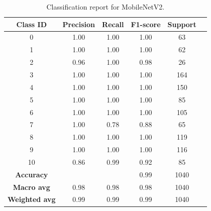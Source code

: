 \begin{table}[h]
    \centering
    \begin{tabular}{cccccc}
        \toprule
        \textbf{Class ID} & \textbf{Precision} & \textbf{Recall} & \textbf{F1-score} & \textbf{Support} \\
        \midrule
        0 & 1.00 & 1.00 & 1.00 & 63 \\
        1 & 1.00 & 1.00 & 1.00 & 62 \\
        2 & 0.96 & 1.00 & 0.98 & 26 \\
        3 & 1.00 & 1.00 & 1.00 & 164 \\
        4 & 1.00 & 1.00 & 1.00 & 150 \\
        5 & 1.00 & 1.00 & 1.00 & 85 \\
        6 & 1.00 & 1.00 & 1.00 & 105 \\
        7 & 1.00 & 0.78 & 0.88 & 65 \\
        8 & 1.00 & 1.00 & 1.00 & 119 \\
        9 & 1.00 & 1.00 & 1.00 & 116 \\
        10 & 0.86 & 0.99 & 0.92 & 85 \\
        \midrule
        \textbf{Accuracy} &  &  & 0.99 & 1040 \\
        \textbf{Macro avg} & 0.98 & 0.98 & 0.98 & 1040 \\
        \textbf{Weighted avg} & 0.99 & 0.99 & 0.99 & 1040 \\
        \bottomrule
    \end{tabular}
    \caption{Classification report for MobileNetV2.}
    \label{tab:classification_report}
\end{table}


